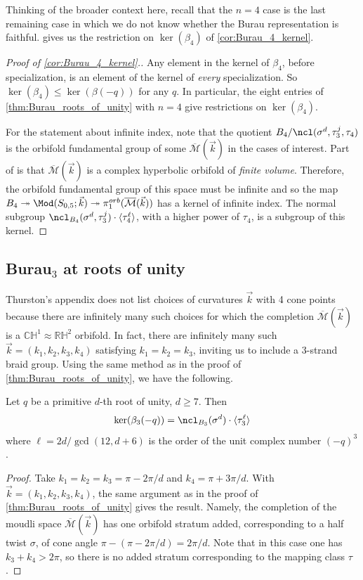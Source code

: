 \documentclass{amsart}
\begin{document}
    Thinking of the broader context here, recall that the $n=4$ case is the last remaining case in which we do not know whether the Burau representation is faithful.  gives us the restriction on $\ker (\beta_4)$ of \cref{cor:Burau_4_kernel}.

    \begin{proof}[Proof of \cref{cor:Burau_4_kernel}.]
        Any element in the kernel of $\beta_4$, before specialization, is an element of the kernel of \textit{every} specialization. So $\ker (\beta_4)\leq \ker (\beta(-q))$ for any $q$. In particular, the eight entries of \cref{thm:Burau_roots_of_unity} with $n=4$ give restrictions on $\ker (\beta_4)$.

        For the statement about infinite index, note that the quotient $B_4/\ncl(\sigma^d,\tau_3^j,\tau_4)$ is the orbifold fundamental group of some $\overline{\mathcal M}(\vec k)$ in the cases of interest. Part of \cite[Theorem 0.2]{Thurston1998ShapesSphere} is that $\overline{\mathcal M}(\vec k)$ is a complex hyperbolic orbifold of \textit{finite volume}. Therefore, the orbifold fundamental group of this space must be infinite and so the map $B_4 \twoheadrightarrow \Mod(S_{0,5};\vec k) \twoheadrightarrow \pi_1^{orb}(\overline{\mathcal M}(\vec k))$ has a kernel of infinite index. The normal subgroup $\ncl_{B_4}(\sigma^d,\tau_3^j) \cdot \langle \tau_4^\ell \rangle$, with a higher power of $\tau_4$, is a subgroup of this kernel.
    \end{proof}

\subsection{Burau$_3$ at roots of unity}\label{subsec:Burau_3}
    Thurston's appendix does not list choices of curvatures $\vec k$ with 4 cone points because there are infinitely many such choices for which the completion $\overline{\mathcal M}(\vec k)$ is a $\mathbb{CH}^1 \approx \mathbb{RH}^2$ orbifold. In fact, there are infinitely many such $\vec k = (k_1,k_2,k_3,k_4)$ satisfying $k_1=k_2=k_3$, inviting us to include a 3-strand braid group. Using the same method as in the proof of \cref{thm:Burau_roots_of_unity}, we have the following.
    \begin{theorem}\label{thm:Burau_3_at_roots_of_unity}
        Let $q$ be a primitive $d$-th root of unity, $d \geq 7$. Then $$\ker(\beta_3(-q)) = \ncl_{B_3}(\sigma^d) \cdot \langle \tau_3^\ell \rangle$$ where $\ell = 2d/\gcd(12,d+6)$ is the order of the unit complex number $(-q)^3$.
    \end{theorem}
    \begin{proof}
        Take $k_1=k_2=k_3=\pi-2\pi/d$ and $k_4=\pi + 3\pi/d$. With $\vec k = (k_1,k_2,k_3,k_4)$, the same argument as in the proof of \cref{thm:Burau_roots_of_unity} gives the result. Namely, the completion of the moudli space $\overline{\mathcal M}(\vec k)$ has one orbifold stratum added, corresponding to a half twist $\sigma$, of cone angle $\pi-(\pi-2\pi/d) = 2\pi/d$. Note that in this case one has $k_3+k_4 > 2\pi$, so there is no added stratum corresponding to the mapping class $\tau$.
    \end{proof}
    
\end{document}
